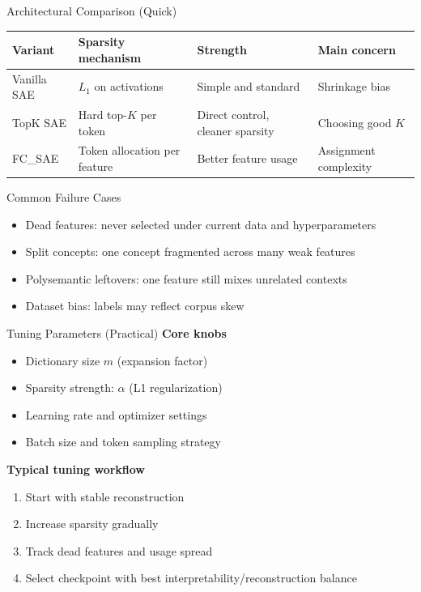 \documentclass[aspectratio=169,12pt]{beamer}
\begin{document}
\begin{frame}{Architectural Comparison (Quick)}
\small
\begin{tabular}{>{\raggedright\arraybackslash}p{} >{\raggedright\arraybackslash}p{} >{\raggedright\arraybackslash}p{} >{\raggedright\arraybackslash}p{}}
\toprule
Variant & Sparsity mechanism & Strength & Main concern \\
\midrule
Vanilla SAE & $L_1$ on activations & Simple and standard & Shrinkage bias \\
TopK SAE & Hard top-$K$ per token & Direct control, cleaner sparsity & Choosing good $K$ \\
FC\_SAE & Token allocation per feature & Better feature usage & Assignment complexity \\
\bottomrule
\end{tabular}
\end{frame}


\begin{frame}{Common Failure Cases}
\begin{itemize}
  \item Dead features: never selected under current data and hyperparameters
  \item Split concepts: one concept fragmented across many weak features
  \item Polysemantic leftovers: one feature still mixes unrelated contexts
  \item Dataset bias: labels may reflect corpus skew
\end{itemize}
\end{frame}


\begin{frame}{Tuning Parameters (Practical)}
\textbf{Core knobs}
\begin{itemize}
  \item Dictionary size $m$ (expansion factor)
  \item Sparsity strength: $\alpha$ (L1 regularization)
  \item Learning rate and optimizer settings
  \item Batch size and token sampling strategy
\end{itemize}

\textbf{Typical tuning workflow}
\begin{enumerate}
  \item Start with stable reconstruction
  \item Increase sparsity gradually
  \item Track dead features and usage spread
  \item Select checkpoint with best interpretability/reconstruction balance
\end{enumerate}
\end{frame}
\end{document}
